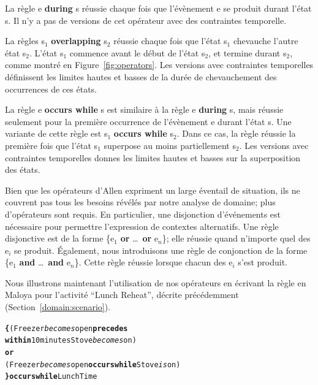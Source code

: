 La règle {\ttfamily e {\bf during} s} réussie chaque fois que l'évènement {\ttfamily e} se produit durant l'état {\ttfamily s}. Il n'y a pas de versions de cet opérateur avec des contraintes temporelle.

La règles {\ttfamily s$_1$ {\bf overlapping} s$_2$} réussie chaque fois que l'état {\ttfamily s$_1$} chevauche l'autre état {\ttfamily s$_2$}. L'état {\ttfamily s$_1$} commence avant le début de l'état {\ttfamily s$_2$}, et termine durant {\ttfamily s$_2$}, comme montré en Figure~\ref{fig:operators}. Les versions avec contraintes temporelles définissent les limites hautes et basses de la durée de chevauchement des occurrences de ces états.

La règle {\ttfamily e {\bf occurs while} s} est similaire à la règle {\ttfamily e {\bf during} s}, mais réussie seulement pour la première occurrence de l'évènement {\ttfamily e} durant l'état {\ttfamily s}. Une variante de cette règle est {\ttfamily s$_1$ {\bf occurs while} s$_2$}. Dans ce cas, la règle réussie la première fois que l'état {\ttfamily s$_1$} superpose au moins partiellement {\ttfamily s$_2$}. Les versions avec contraintes temporelles donnes les limites hautes et basses sur la superposition des états.

Bien que les opérateurs d'Allen expriment un large éventail de situation, ils ne couvrent pas tous les besoins révélés par notre analyse de domaine; plus d'opérateurs sont requis. En particulier, une disjonction d'événements est nécessaire pour permettre l'expression de contextes alternatifs. Une règle disjonctive est de la forme {\ttfamily \{e$_1$ {\bf or} \ldots~{\bf or} e$_n$\}}; elle réussie quand n'importe quel des {\ttfamily e$_i$} se produit. Également, nous introduisons une règle de conjonction de la forme {\ttfamily \{e$_1$ {\bf and} \ldots~{\bf and} e$_n$\}}. Cette règle réussie lorsque chacun des {\ttfamily e$_i$} s'est produit.

Nous illustrons maintenant l'utilisation de nos opérateurs en écrivant la règle en Maloya pour l'activité ``Lunch Reheat'', décrite précédemment (Section~\ref{domain:scenario}). 

\footnotesize
\begin{alltt}
{\bf \{} ( Freezer {\itshape becomes} open {\bf precedes} 
    {\bf within} 10 minutes Stove {\itshape becomes} on )
  {\bf or}
  ( Freezer {\itshape becomes} open {\bf occurs while} Stove{\itshape is} on )
{\bf \} occurs while} LunchTime
\end{alltt}
\normalsize

